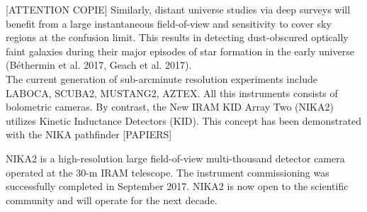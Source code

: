 [ATTENTION COPIE]
Similarly, distant universe studies via deep surveys will
benefit from a large instantaneous field-of-view and sensitivity
to cover sky regions at the confusion limit. This results
in detecting dust-obscured optically faint galaxies during
their major episodes of star formation in the early universe
(B\'ethermin et al. 2017, Geach et al. 2017).\\

The current generation of sub-arcminute resolution experiments include
LABOCA, SCUBA2, MUSTANG2, AZTEX. All this instruments consists of
bolometric cameras. By contrast, the New IRAM KID Array Two (NIKA2)
utilizes Kinetic Inductance Detectors (KID). This concept has been
demonstrated with the NIKA pathfinder [PAPIERS]

NIKA2 is a high-resolution large field-of-view multi-thousand detector
camera operated at the 30-m IRAM telescope. 
The instrument commissioning was successfully completed in September
2017. NIKA2 is now open to the scientific community and will operate
for the next decade.

%


